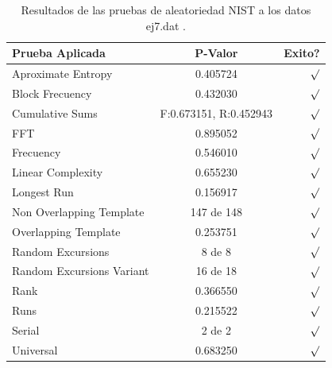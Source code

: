 \documentclass[10pt]{IEEEtran}
\begin{document}
\begin{table}[H]
\caption{Resultados de las pruebas de aleatoriedad NIST a los datos ej7.dat .}
\label{caso1}
\begin{center}
\begin{small}
\begin{tabular}{|l|c|r|}
\hline

Prueba Aplicada &  P-Valor & Exito? \\
\hline

Aproximate Entropy    &   0.405724  & $\surd$ \\

Block Frecuency  &  0.432030  &  $\surd$  \\

Cumulative Sums    &   F:0.673151, R:0.452943 & $\surd$ \\

FFT    &   0.895052 &  $\surd$     \\

Frecuency     &  0.546010 &  $\surd$   \\

Linear Complexity      & 0.655230& $\surd$ \\

Longest Run      &  0.156917 &    $\surd$      \\

Non Overlapping Template      & 147 de 148    &     $\surd$          \\

Overlapping Template      &  0.253751  &      $\surd$      \\

Random Excursions      & 8 de 8  &    $\surd$      \\

Random Excursions Variant & 16 de 18 &     $\surd$    \\

Rank & 0.366550  &      $\surd$      \\

Runs &   0.215522  &     $\surd$        \\

Serial &     2 de 2    &     $\surd$        \\

Universal &   0.683250  &   $\surd$            \\

\hline

\end{tabular}
\end{small}
\end{center}
\end{table}
\end{document}
